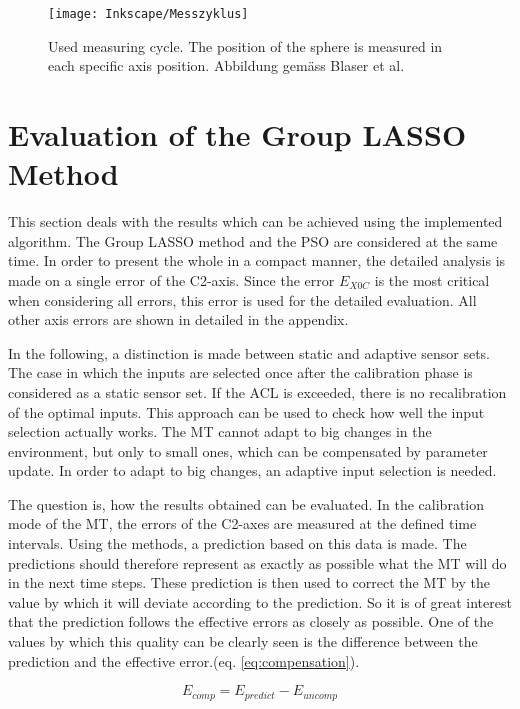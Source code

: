 \begin{figure}[!htb]
    \centering
    \texttt{[image: Inkscape/Messzyklus]} %
    \caption[Measuring cycle]{Used measuring cycle. The position of the sphere is measured in each specific axis position. Abbildung gemäss Blaser et al. \cite{Blaser_2017}}
    \label{fig:messzyklus.}
\end{figure}


\section{Evaluation of the Group LASSO Method}
\label{sec:evaluationglmethod}

This section deals with the results which can be achieved using the implemented algorithm. The Group LASSO method and the PSO are considered at the same time. In order to present the whole in a compact manner, the detailed analysis is made on a single error of the C2-axis. Since the error $E_{X0C}$ is the most critical when considering all errors, this error is used for the detailed evaluation. All other axis errors are shown in detailed in the appendix. 

In the following, a distinction is made between static and adaptive sensor sets. The case in which the inputs are selected once after the calibration phase is considered as a static sensor set. If the ACL is exceeded, there is no recalibration of the optimal inputs. This approach can be used to check how well the input selection actually works. The MT cannot adapt to big changes in the environment, but only to small ones, which can be compensated by parameter update. In order to adapt to big changes, an adaptive input selection is needed.

The question is, how the results obtained can be evaluated. In the calibration mode of the MT, the errors of the C2-axes are measured at the defined time intervals. Using the methods, a prediction based on this data is made. The predictions should therefore represent as exactly as possible what the MT will do in the next time steps. These prediction is then used to correct the MT by the value by which it will deviate according to the prediction. So it is of great interest that the prediction follows the effective errors as closely as possible. One of the values by which this quality can be clearly seen is the difference between the prediction and the effective error.(eq. \ref{eq:compensation}).

 \begin{equation}
	E_{comp} = E_{predict} - E_{uncomp}
	\label{eq:compensation}
\end{equation}

